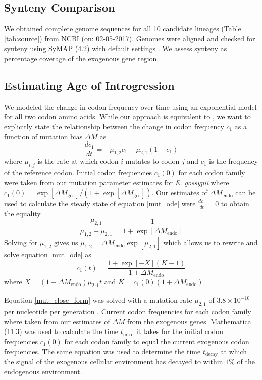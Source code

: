 \documentclass[doublespacing,linenumbers]{bmcart-modified}
\newcommand{\gossypii}{\textit{E. gossypii}\xspace}
\newcommand{\DM}{\ensuremath{{\Delta M}}\xspace}
\begin{document}
\subsection*{Synteny Comparison}
We obtained complete genome sequences for all 10 candidate lineages (Table \ref{tab:source}) from NCBI (on: 02-05-2017).
Genomes were aligned and checked for synteny using SyMAP (4.2) with default settings \citep{soderlund2006, soderlund2011}.
We assess synteny as percentage coverage of the exogenous gene region.

\subsection*{Estimating Age of Introgression}
We modeled the change in codon frequency over time using an exponential model for all two codon amino acids.
While our approach is equivalent to \cite{MaraisEtal2004}, we want to explicitly state the relationship between the change in codon frequency $c_1$ as a function of mutation bias \DM as
\begin{equation}
\frac{d c_1}{d t} = -\mu_{1,2}c_1 - \mu_{2,1}(1-c_1)
\label{mut_ode}
\end{equation}
where $\mu_{i,j}$ is the rate at which codon $i$ mutates to codon $j$ and $c_1$ is the frequency of the reference codon.
Initial codon frequencies $c_1(0)$ for each codon family were taken from our mutation parameter estimates for \gossypii where $c_1(0) = \exp[\DM_\text{gos}]/(1+\exp[\DM_\text{gos}])$. 
Our estimates of $\DM_\text{endo}$ can be used to calculate the steady state of equation \ref{mut_ode} were $\frac{d c_1}{d t} = 0$ to obtain the equality
\begin{equation}
\frac{\mu_{2,1}}{\mu_{1,2} + \mu_{2,1}} = \frac{1}{1+\exp[\DM_\text{endo}]}
\end{equation}
Solving for $\mu_{1,2}$ gives us $\mu_{1,2} = \DM_\text{endo}\exp[\mu_{2,1}]$ which allows us to rewrite and solve equation \ref{mut_ode} as
\begin{equation}
c_1(t) = \frac{ 1 + \exp[-X](K-1) }{ 1+\DM_\text{endo} }
\label{mut_close_form}
\end{equation}
where $X = (1+\DM_\text{endo})\mu_{2,1}t$ and $K = c_1(0)(1+\DM_\text{endo}) $.

Equation \ref{mut_close_form} was solved with a mutation rate $\mu_{2,1}$ of $3.8\times 10^{-10}$ per nucleotide per generation \citep{lang2008}. 
Current codon frequencies for each codon family where taken from our estimates of \DM from the exogenous genes.
Mathematica (11.3) \citep{Mathematica11} was used to calculate the time $t_\text{intro}$ it takes for the initial codon frequencies $c_1(0)$ for each codon family to equal the current exogenous codon frequencies.
The same equation was used to determine the time $t_\text{decay}$ at which the signal of the exogenous cellular environment has decayed to within $1 \%$ of the endogenous environment.
\end{document}
